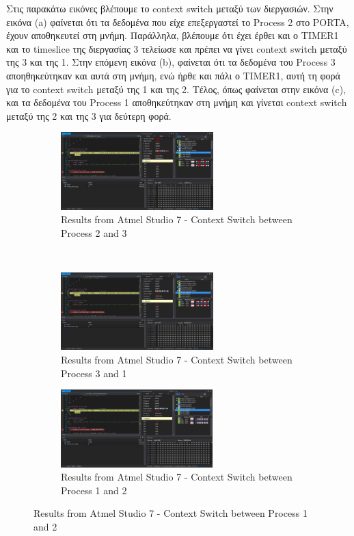 \documentclass{article}
\begin{document}
	\noindent
	Στις παρακάτω εικόνες βλέπουμε το context switch μεταξύ των διεργασιών. Στην εικόνα (a) φαίνεται ότι τα δεδομένα που είχε επεξεργαστεί το Process 2 στο PORTA, έχουν αποθηκευτεί στη μνήμη. Παράλληλα, βλέπουμε ότι έχει έρθει και ο TIMER1 και το timeslice της διεργασίας 3 τελείωσε και πρέπει να γίνει context switch μεταξύ της 3 και της 1. Στην επόμενη εικόνα (b), φαίνεται ότι τα δεδομένα του Process 3 αποηθηκεύτηκαν και αυτά στη μνήμη, ενώ ήρθε και πάλι ο TIMER1, αυτή τη φορά για το context switch μεταξύ της 1 και της 2. Τέλος, όπως φαίνεται στην εικόνα (c), και τα δεδομένα του Process 1 αποθηκεύτηκαν στη μνήμη και γίνεται context switch μεταξύ της 2 και της 3 για δεύτερη φορά.\\
	\begin{figure}[h!]
		\centering
		\begin{subfigure}[t]{0.5\textwidth}
			\centering
			\includegraphics[height=3cm,width=\linewidth]{./results/lab8_sim_cs_2_3.png}
			\caption{Results from Αtmel Studio 7 - Context Switch between Process 2 and 3}
		\end{subfigure}%
		~
		\begin{subfigure}[t]{0.5\textwidth}
			\centering
			\includegraphics[height=3cm,width=\linewidth]{./results/lab8_sim_cs_3_1.png}
			\caption{Results from Αtmel Studio 7 - Context Switch between Process 3 and 1}
		\end{subfigure}
		
		\begin{subfigure}[t]{0.5\textwidth}
			\centering
			\includegraphics[height=3cm,width=\linewidth]{./results/lab8_sim_cs_1_2.png}
			\caption{Results from Αtmel Studio 7 - Context Switch between Process 1 and 2}
		\end{subfigure}
	\end{figure}
\end{document}
